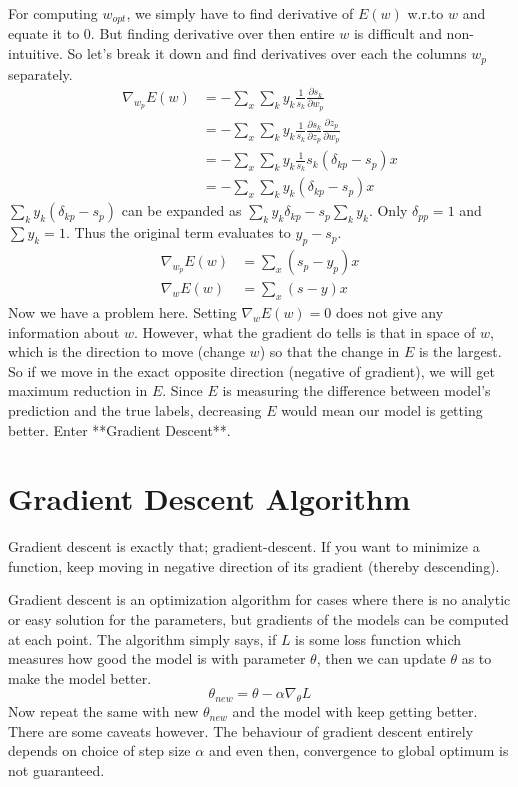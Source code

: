 \documentclass[12pt,crop=false,class=article,convert={density=300,outext=.compiled.png}]{standalone}
\begin{document}
For computing $w_{opt}$, we simply have to find derivative of $E(w)$
w.r.to $w$ and equate it to 0. But finding derivative over then entire
$w$ is difficult and non-intuitive. So let's break it down and find
derivatives over each the columns $w_p$ separately.
%
\begin{align*}
\nabla_{w_p} E(w) 
&= -\sum_x \sum_k y_k \frac{1}{s_k} \frac{\partial s_k}{\partial w_p}
\\
&= -\sum_x \sum_k y_k \frac{1}{s_k} \frac{\partial s_k}{\partial z_p} \frac{\partial z_p}{\partial w_p} 
\\
&= -\sum_x \sum_k y_k \frac{1}{s_k} s_k(\delta_{kp} - s_p) x
\\
&= -\sum_x \sum_k y_k (\delta_{kp} - s_p) x
\end{align*}
%
$\sum_k y_k (\delta_{kp} - s_p)$ can be expanded as
$\sum_k y_k \delta_{kp} - s_p\sum_k y_k$. Only $\delta_{pp}=1$ and
$\sum y_k =1$. Thus the original term evaluates to $y_p - s_p$.
%
\begin{align*}
\nabla_{w_p} E(w) &= \sum_x (s_p - y_p) x
\\
\nabla_{w} E(w) &= \sum_x (s - y) x
\end{align*}
%
Now we have a problem here. Setting $\nabla_w E(w)=0$ does not give any
information about $w$. However, what the gradient do tells is that in
space of $w$, which is the direction to move (change $w$) so that the
change in $E$ is the largest. So if we move in the exact opposite
direction (negative of gradient), we will get maximum reduction in $E$.
Since $E$ is measuring the difference between model's prediction and the
true labels, decreasing $E$ would mean our model is getting better.
Enter **Gradient Descent**.

\section*{Gradient Descent Algorithm}


Gradient descent is exactly that; gradient-descent. If you want to
minimize a function, keep moving in negative direction of its gradient
(thereby descending).

Gradient descent is an
optimization algorithm for cases where there is no analytic or easy
solution for the parameters, but gradients of the models can be computed
at each point. The algorithm simply says, if $L$ is some loss function
which measures how good the model is with parameter $\theta$, then we
can update $\theta$ as to make the model better. 
%
$$\theta_{new} = \theta - \alpha \nabla_\theta L$$
%
Now repeat the same with new $\theta_{new}$ and the model with keep
getting better. There are some caveats however. The behaviour of
gradient descent entirely depends on choice of step size $\alpha$ and
even then, convergence to global optimum is not guaranteed.
\end{document}
